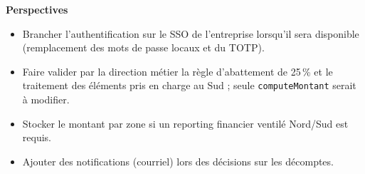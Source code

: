 \documentclass[10.5pt,a4paper]{article}
\newcommand{\code}[1]{\texttt{\small #1}}
\begin{document}
\textbf{Perspectives}
\begin{itemize}
  \item Brancher l'authentification sur le SSO de l'entreprise lorsqu'il sera disponible (remplacement des mots de passe locaux et du TOTP).
  \item Faire valider par la direction métier la règle d'abattement de 25\,\% et le traitement des éléments pris en charge au Sud ; seule \code{computeMontant} serait à modifier.
  \item Stocker le montant par zone si un reporting financier ventilé Nord/Sud est requis.
  \item Ajouter des notifications (courriel) lors des décisions sur les décomptes.
\end{itemize}
\end{document}
